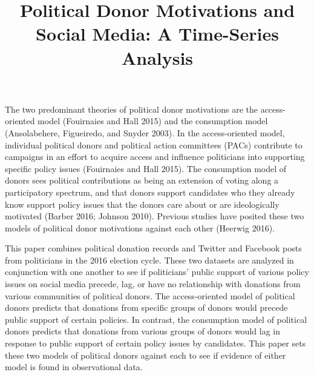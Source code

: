 \documentclass[12pt,]{article}
\title{Political Donor Motivations and Social Media: A Time-Series Analysis  }
\author{\Large \vspace{0.05in} \newline\normalsize\emph{}  }
\date{}
\newcommand*{\authorfont}{\fontfamily{phv}\selectfont}
\begin{document}
	
%

{%
\setlength{\parindent}{0pt}
\thispagestyle{plain}
{\fontsize{18}{20}\selectfont\raggedright 
\maketitle  %

}

{
   \vskip 13.5pt\relax \normalsize\fontsize{11}{12} 
\textbf{\authorfont } \hskip 15pt \emph{\small }   

}

}






\vskip -8.5pt



\noindent \doublespacing 

The two predominant theories of political donor motivations are the
access-oriented model (Fouirnaies and Hall 2015) and the consumption
model (Ansolabehere, Figueiredo, and Snyder 2003). In the
access-oriented model, individual political donors and political action
committees (PACs) contribute to campaigns in an effort to acquire access
and influence politicians into supporting specific policy issues
(Fouirnaies and Hall 2015). The consumption model of donors sees
political contributions as being an extension of voting along a
participatory spectrum, and that donors support candidates who they
already know support policy issues that the donors care about or are
ideologically motivated (Barber 2016; Johnson 2010). Previous studies
have posited these two models of political donor motivations against
each other (Heerwig 2016).

This paper combines political donation records and Twitter and Facebook
posts from politicians in the 2016 election cycle. These two datasets
are analyzed in conjunction with one another to see if politicians'
public support of various policy issues on social media precede, lag, or
have no relationship with donations from various communities of
political donors. The access-oriented model of political donors predicts
that donations from specific groups of donors would precede public
support of certain policies. In contrast, the consumption model of
political donors predicts that donations from various groups of donors
would lag in response to public support of certain policy issues by
candidates. This paper sets these two models of political donors against
each to see if evidence of either model is found in observational data.
\end{document}
